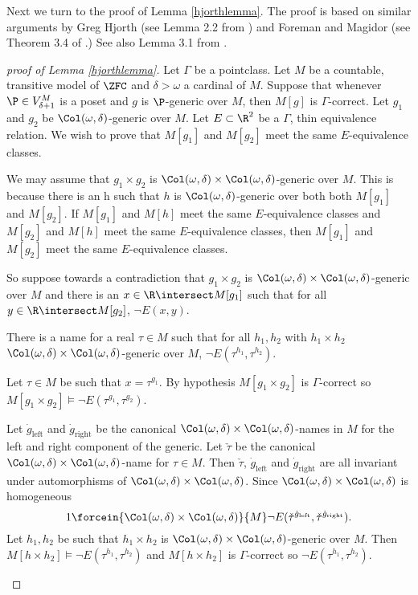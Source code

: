 \documentclass[oneside,12pt]{amsart}
\begin{document}
Next we turn to the proof of Lemma \ref{hjorthlemma}.
The proof is based on similar arguments by Greg Hjorth (see Lemma 2.2 from \cite{Hjorth_applications_of_course_imt}) and Foreman and Magidor (see Theorem 3.4 of \cite{Foreman_and_Magidor}.)
See also Lemma 3.1 from \cite{Schlict_Thin_Equivalence_Relations}.

\begin{proof}[proof of Lemma \ref{hjorthlemma}]
Let $\Gamma$ be a pointclass.
Let $M$ be a countable, transitive model of $\ZFC$ and  $\delta>\omega$ a cardinal of $M$.
Suppose that whenever $\P\in V^M_{\delta+1}$ is a poset and $g$ is $\P$-generic over $M$, then
$M[g]$ is $\Gamma$-correct. Let $g_1$ and $g_2$ be $\Col(\omega, \delta)$-generic over $M$.
Let $E\subset\R^2$ be a $\Gamma$, thin equivalence relation.
We wish to prove that $M[g_1]$ and $M[g_2]$ meet the same $E$-equivalence classes.

We may assume that $g_1\times g_2$ is $\Col(\omega, \delta)\times \Col(\omega, \delta)$-generic over $M$.
This is because there is an h such that $h$ is $\Col(\omega, \delta)$-generic over both
both $M[g_1]$ and $M[g_2]$. If $M[g_1]$ and $M[h]$ meet the same $E$-equivalence classes and
$M[g_2]$ and $M[h]$ meet the same $E$-equivalence classes, then
$M[g_1]$ and $M[g_2]$ meet the same $E$-equivalence classes.

So suppose towards a contradiction that $g_1\times g_2$ is $\Col(\omega, \delta)\times \Col(\omega, \delta)$-generic over $M$
and there is an $x\in\R\intersect M[g_1]$ such that for all $y\in \R\intersect M[g_2]$, $\neg E(x,y)$.

\begin{claim}[Claim 1]
There is a name for a real $\tau\in M$ such that for all $h_1,h_2$
with $h_1\times h_2$ $\Col(\omega, \delta)\times \Col(\omega, \delta)$-generic over $M$,
$\neg E(\tau^{h_1},\tau^{h_2})$.
\end{claim}
\begin{subproof}
Let $\tau\in M$ be such that $x=\tau^{g_1}$. By hypothesis $M[g_1\times g_2]$ is $\Gamma$-correct
so $M[g_1\times g_2]\models \neg E(\tau^{g_1},\tau^{g_2})$.

Let $\dot{g}_{\text{left}}$ and $\dot{g}_{\text{right}}$
be the canonical $\Col(\omega, \delta)\times \Col(\omega, \delta)$-names in $M$ for the left and right component of the generic.
Let $\check{\tau}$ be the canonical $\Col(\omega, \delta)\times \Col(\omega, \delta)$-name for $\tau\in M$.
Then $\check{\tau}$, $\dot{g}_{\text{left}}$ and $\dot{g}_{\text{right}}$ are all invariant under automorphisms of $\Col(\omega, \delta)\times \Col(\omega, \delta)$.
Since $\Col(\omega, \delta)\times \Col(\omega, \delta)$ is homogeneous
$$1\forcein{\Col(\omega, \delta)\times \Col(\omega, \delta)}{M} \neg E(\check{\tau}^{\dot{g}_{\text{left}}},\check{\tau}^{\dot{g}_{\text{right}}}).$$
Let $h_1,h_2$ be such that $h_1\times h_2$ is $\Col(\omega, \delta)\times \Col(\omega, \delta)$-generic over $M$.
Then $M[h\times h_2]\models \neg E(\tau^{h_1},\tau^{h_2})$ and $M[h\times h_2]$ is $\Gamma$-correct so $\neg E(\tau^{h_1},\tau^{h_2})$.
\end{subproof}


\end{proof}
\end{document}

